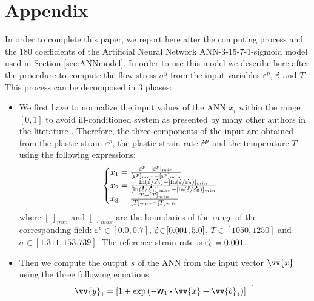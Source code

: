 \documentclass[twoside,english,1p,final,sort&compress]{elsarticle}
\theoremstyle{plain}
\newcommand{\w}{\mbox{\large\ensuremath{\mathsf{w}}}}
\newcommand{\dotp}{\boldsymbol{\cdot}}
\newcommand{\mdot}[1]{\accentset{\mbox{\bfseries .}}{#1}}
\renewcommand{\overrightarrow}{\vv}
\begin{document}



\section*{Appendix\label{sec:Appendix}}
In order to complete this paper, we report here after the computing process and the $180$ coefficients of the Artificial Neural Network ANN-3-15-7-1-sigmoid model used in Section \ref{sec:ANNmodel}. In order to use this model we describe here after the procedure to compute the flow stress $\sigma^y$ from the input variables $\varepsilon^p$, $\mdot\varepsilon$ and $T$. This process can be decomposed in $3$ phases:
\begin{itemize}
\item We first have to normalize the input values of the ANN $x_i$ within the range $[0,1]$ to avoid ill-conditioned system as presented by many other authors in the literature \cite{Lin-2008-ANN, Lu-2011-ANN}.
Therefore, the three components of the input are obtained from the plastic strain $\varepsilon^p$, the plastic strain rate $\mdot{\varepsilon}^p$ and the temperature $T$ using the following expressions:
\begin{equation}
\begin{cases}
x_1 = \frac{\varepsilon^p - [\varepsilon^p]_{min}}{[\varepsilon^p]_{max} - [\varepsilon^p]_{min}}\\
x_2 = \frac{\ln(\mdot{\varepsilon}/\mdot{\varepsilon_0})-[\ln(\mdot{\varepsilon}/\mdot{\varepsilon_0})]_{min}}{[\ln(\mdot{\varepsilon}/\mdot{\varepsilon_0})]_{max}-[\ln(\mdot{\varepsilon}/\mdot{\varepsilon_0})]_{min}}\label{eq:CR1}\\
x_3 = \frac{T-[T]_{min}}{[T]_{max}-[T]_{min}}
\end{cases}
\end{equation}
where $[~]_{min}$ and $[~]_{max}$  are the boundaries of the range of the corresponding field: $\varepsilon^p\!\in\!\left[0.0,0.7\right]$, $\mdot{\varepsilon}\!\in\!\left[0.001,5.0\right]$, $T\!\in\!\left[1050,1250\right]$ and $\sigma\!\in\!\left[1.311,153.739\right]$. The reference strain rate is $\mdot{\varepsilon_0} = 0.001$.
\item Then we compute the output $s$ of the ANN from the input vector $\overrightarrow{x}$ using the three following equations.
\begin{equation}
\overrightarrow{y}_1 = \left[1 + \exp{\left(- \w_1 \dotp \overrightarrow{x}- \overrightarrow{b}_1\right)}\right]^{-1}
\end{equation}

\end{itemize}
\end{document}
